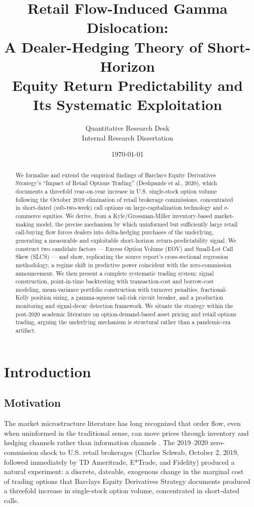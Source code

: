 \documentclass[11pt]{report}
\title{\textbf{Retail Flow-Induced Gamma Dislocation: \\ A Dealer-Hedging Theory of Short-Horizon \\ Equity Return Predictability and Its Systematic Exploitation}}
\author{Quantitative Research Desk \\ \small Internal Research Dissertation}
\date{\today}
\begin{document}
\maketitle

\begin{abstract}
We formalize and extend the empirical findings of Barclays Equity Derivatives Strategy's
``Impact of Retail Options Trading'' (Deshpande et al., 2020), which documents a threefold
year-on-year increase in U.S. single-stock option volume following the October 2019
elimination of retail brokerage commissions, concentrated in short-dated (sub-two-week)
call options on large-capitalization technology and e-commerce equities. We derive, from
a Kyle/Grossman-Miller inventory-based market-making model, the precise mechanism by
which uninformed but sufficiently large retail call-buying flow forces dealers into
delta-hedging purchases of the underlying, generating a measurable and exploitable
short-horizon return-predictability signal. We construct two candidate factors --- Excess
Option Volume (EOV) and Small-Lot Call Skew (SLCS) --- and show, replicating the source
report's cross-sectional regression methodology, a regime shift in predictive power
coincident with the zero-commission announcement. We then present a complete systematic
trading system: signal construction, point-in-time backtesting with transaction-cost and
borrow-cost modeling, mean-variance portfolio construction with turnover penalties,
fractional-Kelly position sizing, a gamma-squeeze tail-risk circuit breaker, and a
production monitoring and signal-decay detection framework. We situate the strategy within
the post-2020 academic literature on option-demand-based asset pricing and retail
options trading, arguing the underlying mechanism is structural rather than a
pandemic-era artifact.
\end{abstract}

\tableofcontents

\chapter{Introduction}

\section{Motivation}
The market microstructure literature has long recognized that order flow, even when
uninformed in the traditional sense, can move prices through inventory and hedging
channels rather than information channels \citep{kyle1985,grossman1988}. The 2019--2020
zero-commission shock to U.S. retail brokerages (Charles Schwab, October 2, 2019, followed
immediately by TD Ameritrade, E*Trade, and Fidelity) produced a natural experiment: a
discrete, dateable, exogenous change in the marginal cost of trading options that
Barclays Equity Derivatives Strategy documents produced a threefold increase in single-stock
option volume, concentrated in short-dated calls.
\end{document}
